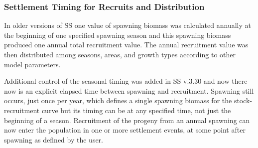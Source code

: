 \subsubsection{Settlement Timing for Recruits and Distribution}
In older versions of SS one value of spawning biomass was calculated annually at the beginning of one specified spawning season and this spawning biomass produced one annual total recruitment value. The annual recruitment value was then distributed among seasons, areas, and growth types according to other model parameters.

Additional control of the seasonal timing was added in SS v.3.30 and now there now is an explicit elapsed time between spawning and recruitment. Spawning still occurs, just once per year, which defines a single spawning biomass for the stock-recruitment curve but its timing can be at any specified time, not just the beginning of a season.  Recruitment of the progeny from an annual spawning can now enter the population in one or more settlement events, at some point after spawning as defined by the user.  

